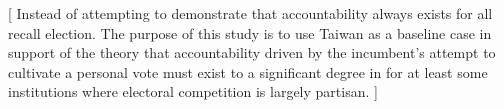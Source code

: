 \documentclass[hyphens, crop=false]{standalone}
\begin{document}
	[
	Instead of attempting to demonstrate that accountability always exists for all recall election.
	The purpose of this study is to use Taiwan as a baseline case in support
	of the theory that accountability driven by the incumbent's attempt to
	cultivate a personal vote must exist to a significant degree
	in for at least some institutions where electoral competition is largely partisan.
	]
	
	
	
	
%		
%		
\end{document}
